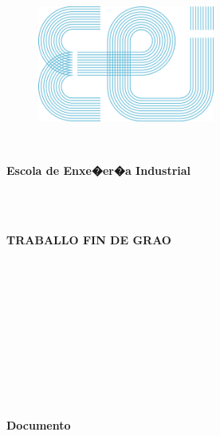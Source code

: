 \documentclass[11pt,twoside]{book}
\begin{document}
\begin{center}
\begin{figure}[htbp]
\begin{center}
\includegraphics[angle=0, height=3.8cm]{images/EEILogo.png}
\end{center}
\end{figure}
\ \\
\begin{large}
\begin{center}
\color{blue}\textbf{Escola de Enxe�er�a Industrial}
\end{center}
\end{large}
\ \\
\ \\
\begin{large}
\begin{center}
\textbf{TRABALLO FIN DE GRAO}
\end{center}
\end{large}
\ \\
\ \\
\begin{large}
\begin{center}
{\titulouno}
\end{center}
\end{large}
\ \\
\ \\
\begin{normalsize}
\begin{center}
\textbf{\grado}
\end{center}
\end{normalsize}
\ \\
\ \\
\ \\
\ \\
\begin{normalsize}
\begin{center}
\textbf{Documento}
\end{center}
\end{normalsize}
\ \\
\begin{normalsize}
\begin{center}

\end{center}
\end{normalsize}
\end{center}
\end{document}
